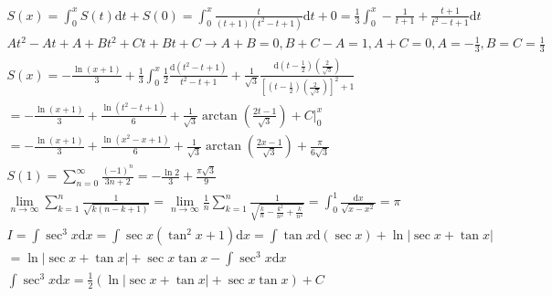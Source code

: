 \documentclass{article}
\begin{document}
\begin{align*}
    S(x) = \int_{0}^{x} S(t) \mathrm{d}t + S(0) = \int_{0}^{x} \frac{t}{(t+1)(t^2-t+1)} \mathrm{d} t + 0  = \frac{1}{3}\int_{0}^{x} -\frac{1}{t+1} + \frac{t+1}{t^2-t+1}\mathrm{d}t \\
    At^2-At+A+Bt^2+Ct+Bt+C \rightarrow A+B = 0,B+C-A =1 ,A+C=0,A=-\frac{1}{3},B=C=\frac{1}{3} \\  
    S(x) = -\frac{\ln(x+1)}{3} + \frac{1}{3}\int_{0}^{x} \frac{1}{2} \frac{\mathrm{d}(t^2-t+1)}{t^2-t+1} + \frac{1}{\sqrt{3}}\frac{\mathrm{d}(t-\frac{1}{2})(\frac{2}{\sqrt{3}})}{[(t-\frac{1}{2})(\frac{2}{\sqrt{3}})]^2+1}  \\ 
    = -\frac{\ln(x+1)}{3} + \frac{\ln(t^2-t+1)}{6} +\frac{1}{\sqrt{3}}\arctan \left(\frac{2t-1}{\sqrt{3}}\right) + C |_{0}^{x} \\ 
    =  -\frac{\ln(x+1)}{3} + \frac{\ln(x^2-x+1)}{6} +\frac{1}{\sqrt{3}}\arctan \left(\frac{2x-1}{\sqrt{3}}\right) + \frac{\pi}{6\sqrt{3}} \\ 
    S(1) = \sum_{n=0}^{\infty}\frac{(-1)^n}{3n+2} = -\frac{\ln 2}{3} + \frac{\pi\sqrt{3}}{9}\\
    \lim_{n \to \infty} \sum_{k=1}^{n} \frac{1}{\sqrt{k(n-k+1)}} = \lim_{n \to \infty} \frac{1}{n} \sum_{k=1}^{n} \frac{1}{\sqrt{\frac{k}{n}-\frac{k^2}{n^2}+\frac{k}{n^2}}} =\int_{0}^{1} \frac{\mathrm{d}x}{\sqrt{x-x^2}} = \pi \\
    I = \int \sec^3 x\mathrm{d}x = \int \sec x(\tan^2 x+1) \mathrm{d}x = \int \tan x\mathrm{d}(\sec x) + \ln|\sec x + \tan x| \\ 
    = \ln|\sec x + \tan x| + \sec x \tan x - \int \sec ^3 x \mathrm{d}x  \\ 
    \int \sec ^3 x \mathrm{d}x = \frac{1}{2}\left(\ln|\sec x + \tan x| + \sec x \tan x \right) + C 
\end{align*}
\end{document}
